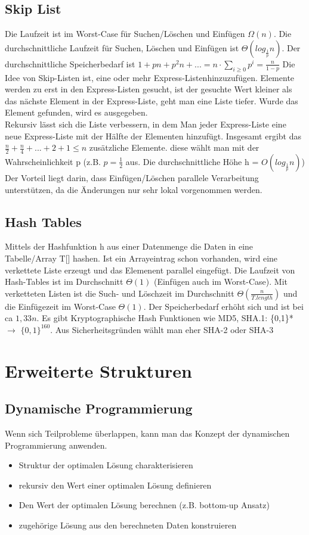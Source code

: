 \documentclass[jou,apacite]{apa6}
\begin{document}
\subsection{Skip List}
Die Laufzeit ist im Worst-Case für Suchen/Löschen und Einfügen $\Omega(n)$. Die durchschnittliche Laufzeit für Suchen, Löschen und Einfügen ist $\Theta(log_{\frac{1}{p}}n)$. Der durchschnittliche Speicherbedarf ist $1 + pn + p^2n + ... = n \cdot \sum_{i\ge0}p^i = \frac{n}{1-p}$ Die Idee von Skip-Listen ist, eine oder mehr \dq Express-Listen\dq  hinzuzufügen. Elemente werden zu erst in den Express-Listen gesucht, ist der gesuchte Wert kleiner als das nächste Element in der Express-Liste, geht man eine Liste \dq tiefer\dq . Wurde das Element gefunden, wird es ausgegeben. \\
Rekursiv lässt sich die Liste verbessern, in dem Man jeder Express-Liste eine neue Express-Liste mit der Hälfte der Elementen hinzufügt. Insgesamt ergibt das $\frac{n}{2} + \frac{n}{4} + ... + 2 + 1 \le n$ zusätzliche Elemente. diese wählt man mit der Wahrscheinlichkeit p (z.B. $p=\frac{1}{2}$ aus. Die durchschnittliche Höhe h = $O(log_{\frac{1}{p}}n)$)\\
Der Vorteil liegt darin, dass Einfügen/Löschen parallele Verarbeitung unterstützen, da die Änderungen nur sehr lokal vorgenommen werden.



\subsection{Hash Tables}
Mittels der Hashfunktion h aus einer Datenmenge die Daten in eine Tabelle/Array T[] hashen. Ist ein Arrayeintrag schon vorhanden, wird eine verkettete Liste erzeugt und das Elemenent parallel eingefügt. Die Laufzeit von Hash-Tables ist im Durchschnitt $\Theta(1)$ (Einfügen auch im Worst-Case). Mit verketteten Listen ist die Such- und Löschzeit im Durchschnitt $\Theta(\frac{n}{T.length})$ und die Einfügezeit im Worst-Case $\Theta(1)$. Der Speicherbedarf erhöht sich und ist bei ca $1,33n$. Es gibt Kryptographische Hash Funktionen wie MD5, SHA.1: \{0,1\}* $\rightarrow$ $\{0,1\}^{160}$. Aus Sicherheitsgründen wählt man eher SHA-2 oder SHA-3



\section{Erweiterte Strukturen}
\subsection{Dynamische Programmierung}
Wenn sich Teilprobleme überlappen, kann man das Konzept der dynamischen Programmierung anwenden. 
\begin{itemize}
    \item Struktur der optimalen Lösung charakterisieren
    \item rekursiv den Wert einer optimalen Lösung definieren
    \item Den Wert der optimalen Lösung berechnen (z.B. bottom-up Ansatz)
    \item zugehörige Lösung aus den berechneten Daten konstruieren
\end{itemize}
\end{document}
